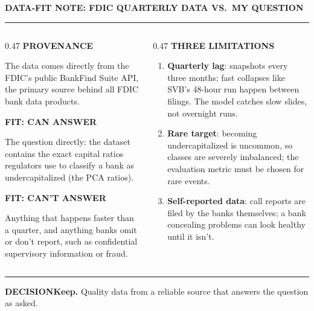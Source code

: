 \documentclass[aspectratio=169,11pt,t]{beamer}
\newcommand{\slidelabel}[1]{%
  {\sffamily\bfseries\fontsize{10}{13}\selectfont\color{navy}\MakeUppercase{#1}}\par
  \vspace{-6pt}\textcolor{hairline}{\rule{\textwidth}{0.5pt}}\par\vspace{3pt}}
\newcommand{\blocklabel}[1]{{\sffamily\bfseries\fontsize{8.5}{11}\selectfont\color{navy}\MakeUppercase{#1}}\par\vspace{2pt}}
\begin{document}
\begin{frame}
  \slidelabel{Data-fit note: FDIC quarterly data vs.\ my question}

  \begin{columns}[t]
    \begin{column}{0.47\textwidth}
      \blocklabel{Provenance}
      {\fontsize{8.4}{10.4}\selectfont The data comes directly from the FDIC's public BankFind Suite API, the primary source behind all FDIC bank data products.}\par\vspace{5pt}

      \blocklabel{Fit: can answer}
      {\fontsize{8.4}{10.4}\selectfont The question directly: the dataset contains the exact capital ratios regulators use to classify a bank as undercapitalized (the PCA ratios).}\par\vspace{5pt}

      \blocklabel{Fit: can't answer}
      {\fontsize{8.4}{10.4}\selectfont Anything that happens faster than a quarter, and anything banks omit or don't report, such as confidential supervisory information or fraud.}
    \end{column}
    \begin{column}{0.47\textwidth}
      \blocklabel{Three limitations}
      {\fontsize{8.4}{10.4}\selectfont
      \begin{enumerate}\itemsep=2pt
        \item \textbf{Quarterly lag}: snapshots every three months; fast collapses like SVB's 48-hour run happen between filings. The model catches slow slides, not overnight runs.
        \item \textbf{Rare target}: becoming undercapitalized is uncommon, so classes are severely imbalanced; the evaluation metric must be chosen for rare events.
        \item \textbf{Self-reported data}: call reports are filed by the banks themselves; a bank concealing problems can look healthy until it isn't.
      \end{enumerate}}
    \end{column}
  \end{columns}
  \vspace{2pt}
  \textcolor{hairline}{\rule{\textwidth}{0.5pt}}\par\vspace{2pt}
  {\sffamily\bfseries\fontsize{8.5}{11}\selectfont\color{navy}DECISION\quad}{\fontsize{8.6}{10.6}\selectfont \textbf{Keep.} Quality data from a reliable source that answers the question as asked.}
\end{frame}
\end{document}
